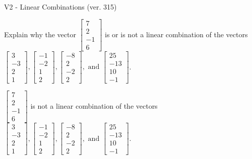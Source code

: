 \begin{exercise}
  \begin{exerciseTitle}V2 - Linear Combinations (ver. 315)\end{exerciseTitle}
  \begin{exerciseStatement}
    Explain why the vector \(\left[\begin{array}{c}
7 \\
2 \\
-1 \\
6
\end{array}\right]\)  is or is not a linear 
	combination of the vectors \(\left[\begin{array}{c}
3 \\
-3 \\
2 \\
1
\end{array}\right] , \left[\begin{array}{c}
-1 \\
-2 \\
1 \\
2
\end{array}\right] , \left[\begin{array}{c}
-8 \\
2 \\
-2 \\
2
\end{array}\right] , \text{ and } \left[\begin{array}{c}
25 \\
-13 \\
10 \\
-1
\end{array}\right]\).
	


  \end{exerciseStatement}
  \begin{exerciseAnswer}
   \(\left[\begin{array}{c}
7 \\
2 \\
-1 \\
6
\end{array}\right]\) 
  	 is not  
	a linear combination of the vectors \(\left[\begin{array}{c}
3 \\
-3 \\
2 \\
1
\end{array}\right] , \left[\begin{array}{c}
-1 \\
-2 \\
1 \\
2
\end{array}\right] , \left[\begin{array}{c}
-8 \\
2 \\
-2 \\
2
\end{array}\right] , \text{ and } \left[\begin{array}{c}
25 \\
-13 \\
10 \\
-1
\end{array}\right]\).


\end{exerciseAnswer}
\end{exercise}
